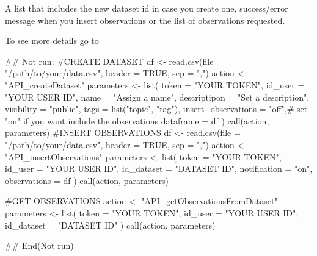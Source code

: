\documentclass[a4paper]{book}
\begin{document}
%
\begin{Value}
A list that includes the new dataset id in case you create one, success/error message when you insert observations or the list of observations requested.
\end{Value}
%
\begin{SeeAlso}\relax
To see more details go to 
\end{SeeAlso}
%
\begin{Examples}
\begin{ExampleCode}
## Not run: 
#CREATE DATASET
df <- read.csv(file = "/path/to/your/data.csv", header = TRUE, sep = ",")
action <- "API_createDataset"
parameters <- list(
token = "YOUR TOKEN",
id_user = "YOUR USER ID",
name = "Assign a name",
descriptipon = "Set a description",
visibility = "public",
tags = list("topic", "tag"),
insert_observations = "off",# set "on" if you want include the observations
dataframe = df
)
call(action, parameters)
#INSERT OBSERVATIONS
df <- read.csv(file = "/path/to/your/data.csv", header = TRUE, sep = ",")
action <- "API_insertObservations"
parameters <- list(
token = "YOUR TOKEN",
id_user = "YOUR USER ID",
id_dataset = "DATASET ID",
notification = "on",
observations = df
)
call(action, parameters)

#GET OBSERVATIONS
action <- "API_getObservationsFromDataset"
parameters <- list(
token = "YOUR TOKEN",
id_user = "YOUR USER ID",
id_dataset = "DATASET ID"
)
call(action, parameters)

## End(Not run)
\end{ExampleCode}
\end{Examples}
\printindex{}
\end{document}
